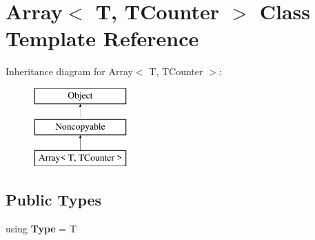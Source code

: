 \hypertarget{classArray}{}\section{Array$<$ T, T\+Counter $>$ Class Template Reference}
\label{classArray}
Inheritance diagram for Array$<$ T, T\+Counter $>$\+:\begin{figure}[H]
\begin{center}
\leavevmode
\includegraphics[height=3.000000cm]{classArray}
\end{center}
\end{figure}
\subsection*{Public Types}
\begin{DoxyCompactItemize}
\item 
\hypertarget{classArray_abe06e3ce546d101b3ccf2b1398445a1a}{}\label{classArray_abe06e3ce546d101b3ccf2b1398445a1a} 
using {\bfseries Type} = T
\end{DoxyCompactItemize}
